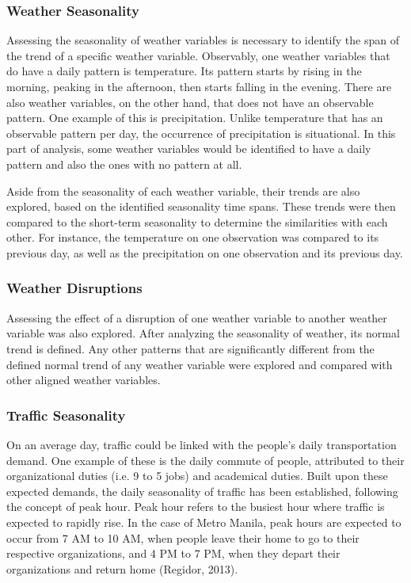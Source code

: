 \subsubsection{Weather Seasonality}
Assessing the seasonality of weather variables is necessary to identify the span of the trend of a specific weather variable. Observably, one weather variables that do have a daily pattern is temperature. Its pattern starts by rising in the morning, peaking in the afternoon, then starts falling in the evening. There are also weather variables, on the other hand, that does not have an observable pattern. One example of this is precipitation. Unlike temperature that has an observable pattern per day, the occurrence of precipitation is situational. In this part of analysis, some weather variables would be identified to have a daily pattern and also the ones with no pattern at all. 

Aside from the seasonality of each weather variable, their trends are also explored, based on the identified seasonality time spans. These trends were then compared to the short-term seasonality to determine the similarities with each other. For instance, the temperature on one observation was compared to its previous day, as well as the precipitation on one observation and its previous day.

\subsubsection{Weather Disruptions}
Assessing the effect of a disruption of one weather variable to another weather variable was also explored. After analyzing the seasonality of weather, its normal trend is defined. Any other patterns that are significantly different from the defined normal trend of any weather variable were explored and compared with other aligned weather variables.

\subsubsection{Traffic Seasonality}
On an average day, traffic could be linked with the people's daily transportation demand. One example of these is the daily commute of people, attributed to their organizational duties (i.e. 9 to 5 jobs) and academical duties. Built upon these expected demands, the daily seasonality of traffic has been established, following the concept of peak hour. Peak hour refers to the busiest hour where traffic is expected to rapidly rise. In the case of Metro Manila, peak hours are expected to occur from 7 AM to 10 AM, when people leave their home to go to their respective organizations, and 4 PM to 7 PM, when they depart their organizations and return home (Regidor, 2013).

